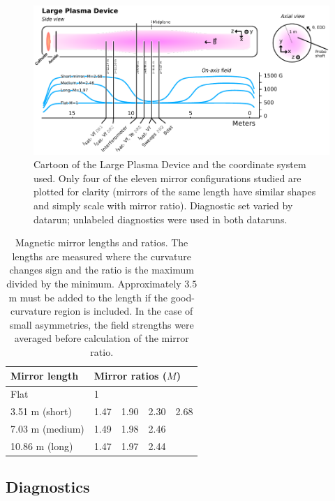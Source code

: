 \begin{figure}
    \centering
    \includegraphics[width=\textwidth]{figures/fig1.pdf}
    \caption[Cartoon of the mirror turbulence experiment setup]{Cartoon of the Large Plasma Device and the coordinate system used. Only four of the eleven mirror configurations studied are plotted for clarity (mirrors of the same length have similar shapes and simply scale with mirror ratio). Diagnostic set varied by datarun; unlabeled diagnostics were used in both dataruns.}
    \label{fig:magnetic_geometry}
\end{figure}

\begin{table}
 \centering
 \begin{tabular}{l l l l l}
 Mirror length & \multicolumn{4}{l}{Mirror ratios ($M$)} \\
 \hline
 Flat & 1 & & & \\
  3.51 m (short) & 1.47 & 1.90 & 2.30 & 2.68 \\ 
 7.03 m (medium) & 1.49 & 1.98 & 2.46 & \\
 10.86 m (long) & 1.47 & 1.97 & 2.44 & \\
 \end{tabular}
\caption[Magnetic mirror lengths and ratios]{\label{tab:fields}Magnetic mirror lengths and ratios. The lengths are measured where the curvature changes sign and the ratio is the maximum divided by the minimum. Approximately $3.5$m must be added to the length if the good-curvature region is included. In the case of small asymmetries, the field strengths were averaged before calculation of the mirror ratio.}
\end{table}

\subsection{\label{sec:sub_diagnostics}Diagnostics}

